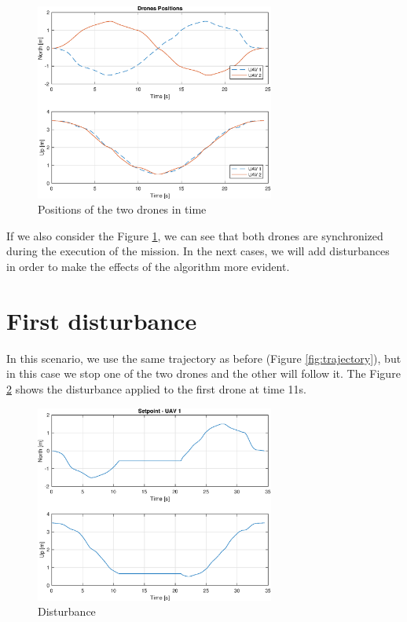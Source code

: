 \begin{figure}
\centering
\includegraphics[width=0.7\textwidth]{chapters/chapter-04/figures/overlapped.eps}
\caption{Positions of the two drones in time}
\label{fig:overlapped}
\end{figure}

If we also consider the Figure \ref{fig:overlapped}, we can see that both drones
are synchronized during the execution of the mission. In the next cases, we will
add disturbances in order to make the effects of the algorithm more evident.


\section{First disturbance}
In this scenario, we use the same trajectory as before (Figure \ref{fig:trajectory}),
but in this case we stop one of the two drones and the other will follow it.
The Figure \ref{fig:disturbance} shows the disturbance applied to the first drone at time 11s.

\begin{figure}
\centering
\includegraphics[width=0.7\textwidth]{chapters/chapter-04/figures/pos_1.eps}
\caption{Disturbance}
\label{fig:disturbance}
\end{figure}

